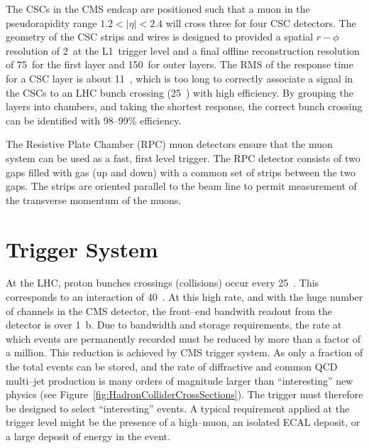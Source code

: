 The CSCs in the CMS endcap are positioned such that a muon in the pseudorapidity
range $1.2 < |\eta| < 2.4$ will cross three for four CSC detectors.  The
geometry of the CSC strips and wires is designed to provided a spatial $r-\phi$
resolution of 2~\milli\meter at the L1~trigger level and a final offline
reconstruction resolution of 75~\micro\meter for the first layer and
150~\micro\meter for outer layers.  The RMS of the response time for a CSC layer
is about 11~\nano\second, which is too long to correctly associate a signal in
the CSCs to an LHC bunch crossing (25~\nano\second) with high efficiency.  By
grouping the layers into chambers, and taking the shortest response, the correct
bunch crossing can be identified with \mbox{98--99\%} efficiency.

The Resistive Plate Chamber (RPC) muon detectors ensure that the muon system can
be used as a fast, first level trigger.  The RPC detector consists of two gaps
filled with gas (up and down) with a common set of strips between the two gaps.
The strips are oriented parallel to the beam line to permit measurement of the
transverse momentum of the muons.

\section{Trigger System}
\label{sec:Trigger}

At the LHC, proton bunches crossings (collisions) occur every 25~\nano\second.
This corresponds to an interaction of 40~\mega\hertz.  At this high rate, and
with the huge number of channels in the CMS detector, the front--end bandwith
readout from the detector is over 1~\peta b\per\second.  Due to bandwidth and
storage requirements, the rate at which events are permanently recorded must be
reduced by more than a factor of a million. This reduction is achieved by CMS
trigger system.  As only a fraction of the total events can be stored, and the
rate of diffractive and common QCD multi--jet production is many orders of
magnitude larger than ``interesting'' new physics (see
Figure~\ref{fig:HadronColliderCrossSections}).  The trigger must therefore be
designed to select ``interesting'' events.  A typical requirement applied at the
trigger level might be the presence of a high--\pt muon, an isolated ECAL
deposit, or a large deposit of energy in the event.

